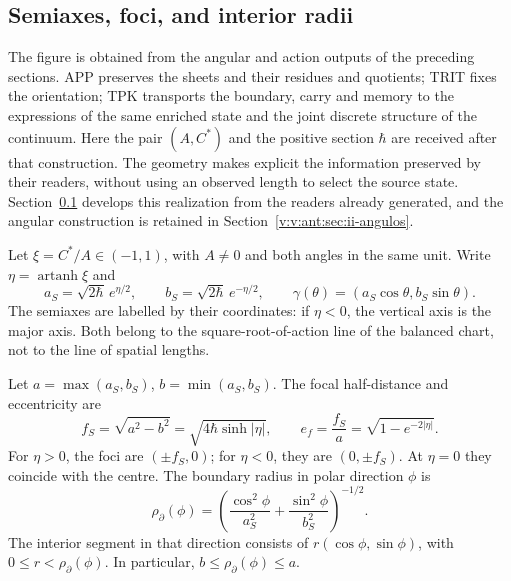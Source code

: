 
\subsection{Semiaxes, foci, and interior radii}
\label{ii:sec:ii-elipse-geometria}

The figure is obtained from the angular and action outputs of the preceding sections. APP preserves the sheets and their residues and quotients; TRIT fixes the orientation; TPK transports the boundary, carry and memory to the expressions of the same enriched state and the joint discrete structure of the continuum. Here the pair \((A,C^*)\) and the positive section \(\hbar\) are received after that construction. The geometry makes explicit the information preserved by their readers, without using an observed length to select the source state. Section~\ref{ii:sec:ii-elipse-geometria} develops this realization from the readers already generated, and the angular construction is retained in Section~\ref{v:v:ant:sec:ii-angulos}.

Let \(\xi=C^*/A\in(-1,1)\), with \(A\ne0\) and both angles in the
same unit. Write \(\eta=\operatorname{artanh}\xi\) and
\[
 a_S=\sqrt{2\hbar}\,e^{\eta/2},\qquad
 b_S=\sqrt{2\hbar}\,e^{-\eta/2},\qquad
 \gamma(\theta)=(a_S\cos\theta,b_S\sin\theta).
\]
The semiaxes are labelled by their coordinates: if \(\eta<0\), the vertical axis is the major axis. Both belong to the square-root-of-action line of the balanced chart, not to the line of spatial lengths.

\begin{proposition}
\label{ii:prop:ii-elipse-focos}
Let \(a=\max(a_S,b_S)\), \(b=\min(a_S,b_S)\). The focal half-distance
and eccentricity are
\begin{equation}
 f_S=\sqrt{a^2-b^2}
 =\sqrt{4\hbar\sinh|\eta|},\qquad
 e_f=\frac{f_S}{a}=\sqrt{1-e^{-2|\eta|}}.
 \label{ii:eq:ii-elipse-focal}
\end{equation}
For \(\eta>0\), the foci are \((\pm f_S,0)\); for \(\eta<0\), they are \((0,\pm f_S)\). At \(\eta=0\) they coincide with the centre. The boundary radius in polar direction \(\phi\) is
\begin{equation}
 \rho_{\partial}(\phi)
 =\left(\frac{\cos^2\phi}{a_S^2}
        +\frac{\sin^2\phi}{b_S^2}\right)^{-1/2}.
 \label{ii:eq:ii-elipse-radio-polar}
\end{equation}
The interior segment in that direction consists of
\(r(\cos\phi,\sin\phi)\), with \(0\le r<\rho_{\partial}(\phi)\).
In particular, \(b\le\rho_{\partial}(\phi)\le a\).
\end{proposition}

